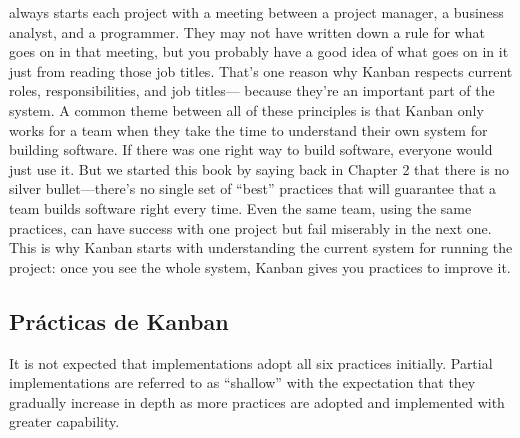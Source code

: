 \begin{itemize}
always starts each project
with a meeting between a project manager, a business analyst, and a programmer.
They may not have written down a rule for what goes on in that meeting, but you
probably have a good idea of what goes on in it just from reading those job titles.
That's one reason why Kanban respects current roles, responsibilities, and job titles—
because they're an important part of the system.
A common theme between all of these principles is that Kanban only works for a
team when they take the time to understand their own system for building software.
If there was one right way to build software, everyone would just use it. But we
started this book by saying back in Chapter 2 that there is no silver bullet—there's no
single set of “best” practices that will guarantee that a team builds software right every
time. Even the same team, using the same practices, can have success with one project
but fail miserably in the next one. This is why Kanban starts with understanding the
current system for running the project: once you see the whole system, Kanban gives
you practices to improve it.
\end{itemize}

\subsection{Prácticas de Kanban}

It is not expected that implementations adopt all six practices initially. Partial implementations are referred to as “shallow” with the expectation that they gradually
increase in depth as more practices are adopted and implemented with greater
capability.

